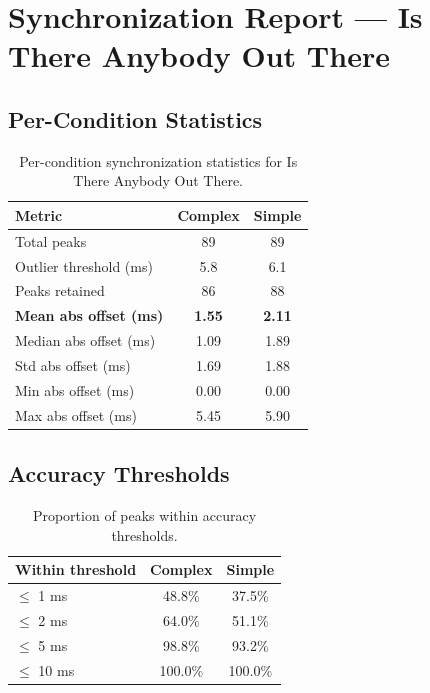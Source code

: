 
\section*{Synchronization Report --- Is There Anybody Out There}

\subsection*{Per-Condition Statistics}

\begin{table}[h!]
\centering
\begin{tabular}{|l|c|c|}
\hline
Metric & Complex & Simple \\
\hline
Total peaks & 89 & 89 \\
Outlier threshold (ms) & 5.8 & 6.1 \\
Peaks retained & 86 & 88 \\
\textbf{Mean abs offset (ms)} & \textbf{1.55} & \textbf{2.11} \\
Median abs offset (ms) & 1.09 & 1.89 \\
Std abs offset (ms) & 1.69 & 1.88 \\
Min abs offset (ms) & 0.00 & 0.00 \\
Max abs offset (ms) & 5.45 & 5.90 \\
\hline
\end{tabular}
\caption{Per-condition synchronization statistics for Is There Anybody Out There.}
\label{tab:sync_stats}
\end{table}

\subsection*{Accuracy Thresholds}

\begin{table}[h!]
\centering
\begin{tabular}{|l|c|c|}
\hline
Within threshold & Complex & Simple \\
\hline
$\leq$ 1 ms & 48.8\% & 37.5\% \\
$\leq$ 2 ms & 64.0\% & 51.1\% \\
$\leq$ 5 ms & 98.8\% & 93.2\% \\
$\leq$ 10 ms & 100.0\% & 100.0\% \\
\hline
\end{tabular}
\caption{Proportion of peaks within accuracy thresholds.}
\label{tab:sync_accuracy}
\end{table}

